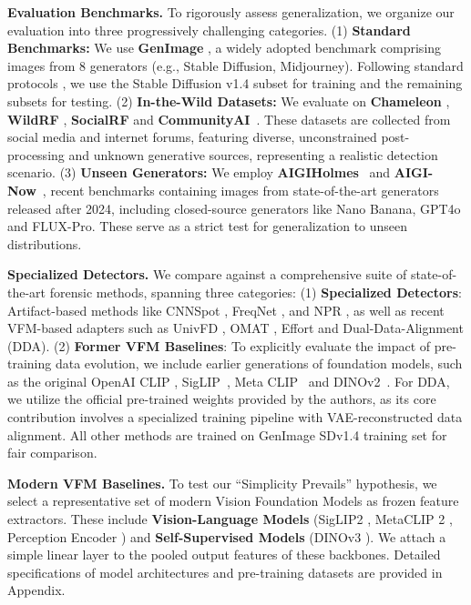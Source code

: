 \documentclass[sigconf,screen]{acmart}
\theoremstyle{plain}
\theoremstyle{definition}
\theoremstyle{remark}
\begin{document}
\textbf{Evaluation Benchmarks.} 
To rigorously assess generalization, we organize our evaluation into three progressively challenging categories. 
(1) \textbf{Standard Benchmarks:} We use \textbf{GenImage} \cite{zhu2023genimage}, a widely adopted benchmark comprising images from 8 generators (e.g., Stable Diffusion, Midjourney). Following standard protocols \cite{ojha2023towards}, we use the Stable Diffusion v1.4 subset for training and the remaining subsets for testing.
(2) \textbf{In-the-Wild Datasets:} We evaluate on \textbf{Chameleon} \cite{yan2024sanity}, \textbf{WildRF} \cite{cavia2024real}, \textbf{SocialRF} and \textbf{CommunityAI}~\cite{li2025artificial}. These datasets are collected from social media and internet forums, featuring diverse, unconstrained post-processing and unknown generative sources, representing a realistic detection scenario.
(3) \textbf{Unseen Generators:} We employ \textbf{AIGIHolmes}~\cite{zhou2025aigi} and \textbf{AIGI-Now}~\cite{chen2025task}, recent benchmarks containing images from state-of-the-art generators released after 2024, including closed-source generators like Nano Banana, GPT4o and FLUX-Pro. These serve as a strict test for generalization to unseen distributions.

\textbf{Specialized Detectors.} 
We compare against a comprehensive suite of state-of-the-art forensic methods, spanning three categories: 
(1) \textbf{Specialized Detectors}: Artifact-based methods like CNNSpot \cite{wang2020cnn}, FreqNet \cite{tan2024frequency}, and NPR \cite{tan2024rethinking}, as well as recent VFM-based adapters such as UnivFD \cite{ojha2023towards}, OMAT \cite{zhou2025breaking}, Effort \cite{yan2024orthogonal} and Dual-Data-Alignment (DDA)\cite{chen2025dual}.
(2) \textbf{Former VFM Baselines}: To explicitly evaluate the impact of pre-training data evolution, we include earlier generations of foundation models, such as the original OpenAI CLIP \cite{radford2021learning}, SigLIP~\cite{zhai2023sigmoid}, Meta CLIP~\cite{xu2023demystifying} and DINOv2~\cite{oquab2023dinov2}. For DDA, we utilize the official pre-trained weights provided by the authors, as its core contribution involves a specialized training pipeline with VAE-reconstructed data alignment. All other methods are trained on GenImage SDv1.4 training set for fair comparison.

\textbf{Modern VFM Baselines.} 
To test our ``Simplicity Prevails'' hypothesis, we select a representative set of modern Vision Foundation Models as frozen feature extractors. These include \textbf{Vision-Language Models} (SigLIP2 \cite{tschannen2025siglip}, MetaCLIP 2 \cite{chuang2025metaclip}, Perception Encoder \cite{bolya2025perception}) and \textbf{Self-Supervised Models} (DINOv3 \cite{simeoni2025dinov3}). We attach a simple linear layer to the pooled output features of these backbones. Detailed specifications of model architectures and pre-training datasets are provided in Appendix.
\end{document}
